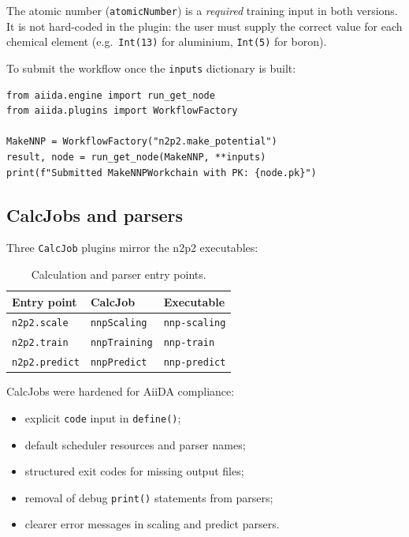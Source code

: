 The atomic number (\texttt{atomicNumber}) is a \emph{required} training input in
both versions.
It is not hard-coded in the plugin: the user must supply the correct value for each
chemical element (e.g.\ \texttt{Int(13)} for aluminium, \texttt{Int(5)} for boron).

To submit the workflow once the \texttt{inputs} dictionary is built:
\begin{lstlisting}
from aiida.engine import run_get_node
from aiida.plugins import WorkflowFactory

MakeNNP = WorkflowFactory("n2p2.make_potential")
result, node = run_get_node(MakeNNP, **inputs)
print(f"Submitted MakeNNPWorkchain with PK: {node.pk}")
\end{lstlisting}

\subsection{CalcJobs and parsers}

Three \texttt{CalcJob} plugins mirror the n2p2 executables:

\begin{table}[htbp]
  \centering
  \caption{Calculation and parser entry points.}
  \label{tab:n2p2-calcs}
  \begin{tabular}{lll}
    \toprule
    Entry point & CalcJob & Executable \\
    \midrule
    \texttt{n2p2.scale}   & \texttt{nnpScaling}  & \texttt{nnp-scaling} \\
    \texttt{n2p2.train}   & \texttt{nnpTraining} & \texttt{nnp-train}   \\
    \texttt{n2p2.predict} & \texttt{nnpPredict}  & \texttt{nnp-predict} \\
    \bottomrule
  \end{tabular}
\end{table}

CalcJobs were hardened for AiiDA compliance:
\begin{itemize}
  \item explicit \texttt{code} input in \texttt{define()};
  \item default scheduler resources and parser names;
  \item structured exit codes for missing output files;
  \item removal of debug \texttt{print()} statements from parsers;
  \item clearer error messages in scaling and predict parsers.
\end{itemize}

